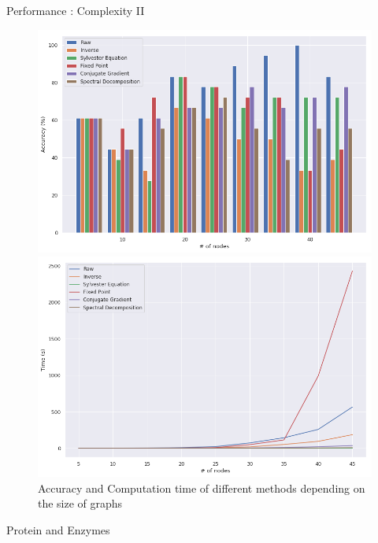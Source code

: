 \documentclass[compress]{beamer}
\begin{document}
\begin{frame}{Performance : Complexity II}
\begin{figure}[!htb]
	\begin{multicols}{2}
		\includegraphics[width=\linewidth]{data/nb_nodes/acc.png}\par
		\includegraphics[width=\linewidth]{data/nb_nodes/time.png}\par
	\end{multicols}
	\caption{Accuracy and Computation time of different methods depending on the size of graphs}
\end{figure}
\end{frame}
\begin{frame}{Protein and Enzymes}

\end{frame}
\end{document}
